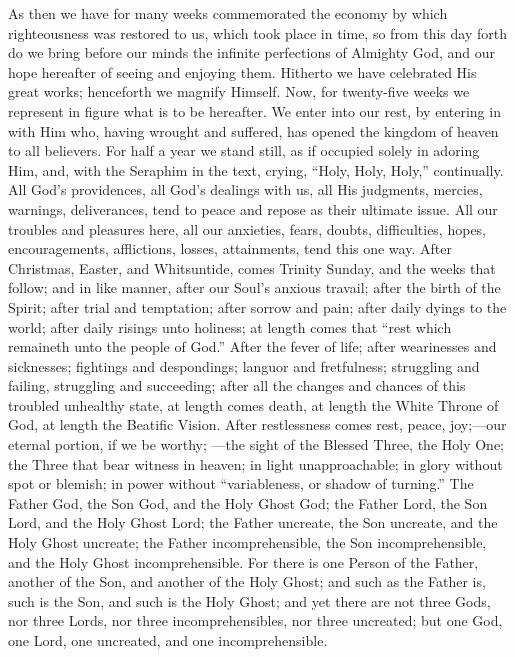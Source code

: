 As then we have for many weeks commemorated the economy by which
righteousness was restored to us, which took place in time, so from
this day forth do we bring before our minds the infinite perfections
of Almighty God, and our hope hereafter of seeing and enjoying them.
Hitherto we have celebrated His great works; henceforth we magnify
Himself. Now, for twenty-five weeks we represent in figure what is to
be hereafter. We enter into our rest, by entering in with Him who,
having wrought and suffered, has opened the kingdom of heaven to all
believers. For half a year we stand still, as if occupied solely in
adoring Him, and, with the Seraphim in the text, crying, ``Holy,
Holy, Holy,'' continually. All God's providences, all God's
dealings with us, all His judgments, mercies, warnings, deliverances,
tend to peace and repose as their ultimate issue. All our troubles and
pleasures here, all our anxieties, fears, doubts, difficulties, hopes,
encouragements, afflictions, losses, attainments, tend this one way.
After Christmas, Easter, and Whitsuntide, comes Trinity Sunday, and
the weeks that follow; and in like manner, after our Soul's anxious
travail; after the birth of the Spirit; after trial and temptation;
after sorrow and pain; after daily dyings to the world; after daily
risings unto holiness; at length comes that ``rest which remaineth
unto the people of God.'' After the fever of life; after
wearinesses and sicknesses; fightings and despondings; languor and
fretfulness; struggling and failing, struggling and succeeding; after
all the changes and chances of this troubled unhealthy state, at
length comes death, at length the White Throne of God, at length the
Beatific Vision. After restlessness comes rest, peace, joy;—our
eternal portion, if we be worthy; —the sight of the Blessed Three,
the Holy One; the Three that bear witness in heaven; in light
unapproachable; in glory without spot or blemish; in power without
``variableness, or shadow of turning.'' The Father God, the
Son God, and the Holy Ghost God; the Father Lord, the Son Lord, and
the Holy Ghost Lord; the Father uncreate, the Son uncreate, and the
Holy Ghost uncreate; the Father incomprehensible, the Son
incomprehensible, and the Holy Ghost incomprehensible. For there is
one Person of the Father, another of the Son, and another of the Holy
Ghost; and such as the Father is, such is the Son, and such is the
Holy Ghost; and yet there are not three Gods, nor three Lords, nor
three incomprehensibles, nor three uncreated; but one God, one Lord,
one uncreated, and one incomprehensible.

